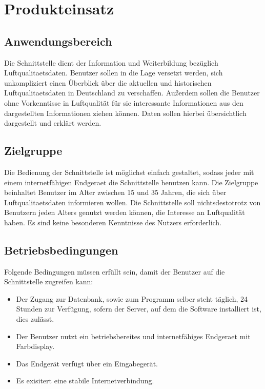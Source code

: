 \section{Produkteinsatz}
\subsection{Anwendungsbereich}
Die Schnittstelle dient der Information und Weiterbildung bezüglich \gls{Luftqualitaetsdaten}. 
Benutzer sollen in die Lage versetzt werden, sich unkompliziert
einen Überblick über die aktuellen und historischen \gls{Luftqualitaetsdaten} in Deutschland zu verschaffen.
Außerdem sollen die Benutzer ohne Vorkenntisse in Luftqualität für sie interessante Informationen aus den dargestellten
Informationen ziehen können. Daten sollen hierbei übersichtlich dargestellt und erklärt werden.
\subsection{Zielgruppe}
Die Bedienung der Schnittstelle ist möglichst einfach gestaltet, sodass jeder mit einem internetfähigen \Gls{Endgeraet} die Schnittstelle benutzen kann.
Die Zielgruppe beinhaltet Benutzer im Alter zwischen 15 und 35 Jahren, die sich über \gls{Luftqualitaetsdaten} informieren wollen. 
Die Schnittstelle soll nichtsdestotrotz von Benutzern jeden Alters genutzt werden können, die Interesse an Luftqualität haben.
Es sind keine besonderen Kenntnisse des Nutzers erforderlich.
\subsection{Betriebsbedingungen}
Folgende Bedingungen müssen erfüllt sein, damit der Benutzer auf die Schnittstelle zugreifen kann:
\begin{itemize} [noitemsep]
    \item Der Zugang zur Datenbank, sowie zum Programm selber steht täglich,
    24 Stunden zur Verfügung, sofern der Server, auf dem die Software installiert ist,
    dies zulässt.
    \item Der Benutzer nutzt ein betriebsbereites und internetfähiges \gls{Endgeraet} mit Farbdisplay.
    \item Das Endgerät verfügt über ein Eingabegerät.
    \item Es exisitert eine stabile Internetverbindung.
\end{itemize}
